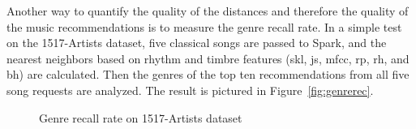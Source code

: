 Another way to quantify the quality of the distances and therefore the quality of the music recommendations is to measure the genre recall rate. In a simple test on the 1517-Artists dataset, five classical songs are passed to Spark, and the nearest neighbors based on rhythm and timbre features (skl, js, mfcc, rp, rh, and bh) are calculated. Then the genres of the top ten recommendations from all five song requests are analyzed. The result is pictured in Figure~\ref{fig:genrerec}.  

\begin{figure}[htbp]
	\centering
	\caption{Genre recall rate on 1517-Artists dataset}
	\label{fig:1517gen}
\end{figure}

